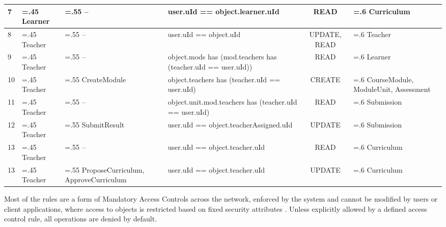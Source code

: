 \begin{landscape}
\begin{table}[!ht]
\begin{tabularx}{23.5cm}{l>{\hsize=.45\hsize}X>{\hsize=.55\hsize}X>{\hsize=1.25\hsize}Xc>{\hsize=.6\hsize}X}
			\midrule
			7  & Learner                  & --                                   & user.uId == object.learner.uId                               & READ           & Curriculum                           \\
			\midrule
			8  & Teacher                  & --                                   & user.uId == object.uId                                       & UPDATE, READ   & Teacher                              \\
			\midrule
			9  & Teacher                  & --                                   & object.mods has (mod.teachers has (teacher.uId == user.uId)) & READ           & Learner                              \\
			\midrule
			10 & Teacher                  & CreateModule                         & object.teachers has (teacher.uId == user.uId)                & CREATE         & CourseModule, ModuleUnit, Assessment \\
			\midrule
			11 & Teacher                  & --                                   & object.unit.mod.teachers has (teacher.uId == user.uId)       & READ           & Submission                           \\
			\midrule
			12 & Teacher                  & SubmitResult                         & user.uId == object.teacherAssigned.uId                       & UPDATE         & Submission                           \\
			\midrule
			13 & Teacher                  & --                                   & user.uId == object.teacher.uId                               & READ           & Curriculum                           \\
			\midrule
            13 & Teacher                  & ProposeCurriculum, ApproveCurriculum & user.uId == object.teacher.uId                               & UPDATE         & Curriculum                           \\
            \midrule
			\bottomrule
		\end{tabularx}
	\end{table}
\end{landscape}

Most of the rules are a form of Mandatory Access Controls across the network, enforced by the system and cannot be modified by
users or client applications, where access to objects is restricted based on fixed security attributes \citep{yuan2005attributed}.
Unless explicitly allowed by a defined access control rule, all operations are denied by default.

